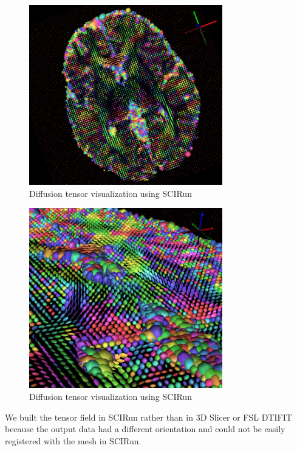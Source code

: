 \begin{figure}[H]
\begin{center}
\includegraphics[width=0.75\textwidth]{Figures/DTI_1.png}
\caption{Diffusion tensor visualization using SCIRun}
\label{fig:tensorvis}
\end{center}
\end{figure}

\begin{figure}[H]
\begin{center}
\includegraphics[width=0.75\textwidth]{Figures/DTI_2.png}
\caption{Diffusion tensor visualization using SCIRun}
\label{fig:tensorvis2}
\end{center}
\end{figure}

We built the tensor field in SCIRun rather than in 3D Slicer \cite{ref:slicer} or FSL DTIFIT because the output data had a different orientation and could not be easily registered with the mesh in SCIRun.


